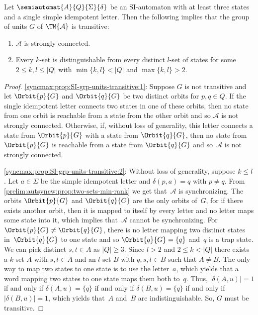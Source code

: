 \begin{proposition} \label{syncmax:prop:SI-grp-units-transitive}
	Let $\semiautomat{A}{Q}{\Sigma}{\delta}$
	be an SI-automaton with at least three states and 
	a single simple idempotent letter.
	Then the following implies that the group of units $G$ of $\TM{\mathcal A}$ is transitive:
	
	\begin{enumerate}
	\item \label{syncmax:prop:SI-grp-units-transitive:1} $\mathcal A$ is strongly connected.
	
	\item \label{syncmax:prop:SI-grp-units-transitive:2} Every $k$-set is distinguishable from every distinct $l$-set of states
	for some $2 \le k, l \le |Q|$ with $\min\{k,l\} < |Q|$ and $\max\{k, l\} > 2$.
	\end{enumerate}
\end{proposition}
\begin{proof}
\ref{syncmax:prop:SI-grp-units-transitive:1}:	Suppose $G$ is not transitive and let $\Orbit{p}{G}$
	and $\Orbit{q}{G}$ be two distinct orbits for $p,q \in Q$.
	If the single idempotent letter connects two states
	in one of these orbits, then no state from one orbit
	is reachable from a state from the other orbit
	and so $\mathcal A$ is not strongly connected.
	Otherwise, if, without loss of generality,
	this letter connects a state from $\Orbit{p}{G}$
	with a state from $\Orbit{q}{G}$,
	then no state from  $\Orbit{p}{G}$
	is reachable from a state from  $\Orbit{q}{G}$
	and so~$\mathcal A$ is not strongly connected.
	
\ref{syncmax:prop:SI-grp-units-transitive:2}: Without loss of generality, suppose $k \le l$. 
Let $a \in \Sigma$ be the simple idempotent letter
and $\delta(p, a) = q$ with $p \ne q$.
From \cref{prelim:autsyncw:prop:two-sets-min-rank} 
we get that~$\mathcal A$ is synchronizing.
The orbits $\Orbit{p}{G}$ and $\Orbit{q}{G}$ are the only orbits of~$G$,
for if there exists another orbit, then it is mapped to itself by every letter
and no letter maps some state into it, which
implies that~$\mathcal A$ cannot be synchronizing.
For $\Orbit{p}{G} \ne \Orbit{q}{G}$,
there is no letter mapping two distinct states in~$\Orbit{q}{G}$
to one state and so $\Orbit{q}{G} = \{q\}$
and~$q$ is a trap state.
We can pick distinct $s, t \in A$ as $|Q| \ge 3$.
Since $l > 2$ and $2 \le k < |Q|$
there exists a $k$-set $A$ with $s,t \in A$
and an $l$-set $B$ with $q, s,t \in B$ such that $A \ne B$.
The only way to map two states to one state is to use the letter~$a$,
which yields that a word mapping two states to one state maps them both to~$q$.
Thus, $|\delta(A, u)| = 1$
if and only if $\delta(A, u) = \{q\}$
if and only if $\delta(B, u) = \{q\}$
if and only if $|\delta(B, u)| = 1$,
which yields that~$A$ and~$B$ are indistinguishable.
So, $G$ must be transitive.
\end{proof}


